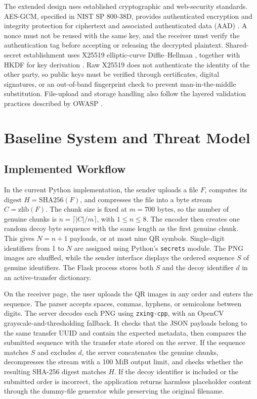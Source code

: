\documentclass[conference]{IEEEtran}
\begin{document}
The extended design uses established cryptographic and web-security standards. AES-GCM, specified in NIST SP 800-38D, provides authenticated encryption and integrity protection for ciphertext and associated authenticated data (AAD) \cite{sp80038d}. A nonce must not be reused with the same key, and the receiver must verify the authentication tag before accepting or releasing the decrypted plaintext. Shared-secret establishment uses X25519 elliptic-curve Diffie--Hellman \cite{rfc7748}, together with HKDF for key derivation \cite{rfc5869}. Raw X25519 does not authenticate the identity of the other party, so public keys must be verified through certificates, digital signatures, or an out-of-band fingerprint check to prevent man-in-the-middle substitution. File-upload and storage handling also follow the layered validation practices described by OWASP \cite{owasp}.

\section{Baseline System and Threat Model}
\subsection{Implemented Workflow}
In the current Python implementation, the sender uploads a file $F$, computes its digest $H = \mathrm{SHA256}(F)$, and compresses the file into a byte stream $C = \mathrm{zlib}(F)$. The chunk size is fixed at $m = 700\text{ bytes}$, so the number of genuine chunks is $n = \lceil |C|/m \rceil$, with $1 \le n \le 8$. The encoder then creates one random decoy byte sequence with the same length as the first genuine chunk. This gives $N = n + 1$ payloads, or at most nine QR symbols. Single-digit identifiers from 1 to $N$ are assigned using Python's \texttt{secrets} module. The PNG images are shuffled, while the sender interface displays the ordered sequence $S$ of genuine identifiers. The Flask process stores both $S$ and the decoy identifier $d$ in an active-transfer dictionary.

On the receiver page, the user uploads the QR images in any order and enters the sequence. The parser accepts spaces, commas, hyphens, or semicolons between digits. The server decodes each PNG using \texttt{zxing-cpp}, with an OpenCV grayscale-and-thresholding fallback. It checks that the JSON payloads belong to the same transfer UUID and contain the expected metadata, then compares the submitted sequence with the transfer state stored on the server. If the sequence matches $S$ and excludes $d$, the server concatenates the genuine chunks, decompresses the stream with a 100 MiB output limit, and checks whether the resulting SHA-256 digest matches $H$. If the decoy identifier is included or the submitted order is incorrect, the application returns harmless placeholder content through the dummy-file generator while preserving the original filename.
\end{document}
